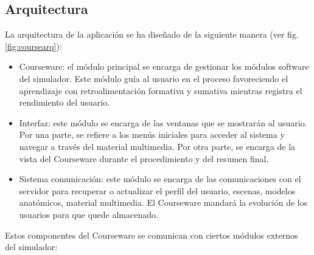 \subsection{Arquitectura}
\label{course:arq}
La arquitectura de la aplicación se ha diseñado de la siguiente manera (ver fig. \ref{fig:coursearq}):
\begin{itemize}
    \item \ac{Courseware}: el módulo principal se encarga de gestionar los módulos software del simulador. Este módulo guía al usuario en el proceso favoreciendo el aprendizaje con retroalimentación formativa y sumativa mientras registra el rendimiento del usuario.%
    \item Interfaz: este módulo se encarga de las ventanas que se mostrarán al usuario. Por una parte, se refiere a los menús iniciales para acceder al sistema y navegar a través del material multimedia. Por otra parte, se encarga de la vista del \ac{Courseware} durante el procedimiento y del resumen final.

\item Sistema comunicación: este módulo se encarga de las comunicaciones con el servidor para recuperar o actualizar el perfil del usuario, escenas, modelos anatómicos, material multimedia. El \ac{Courseware} mandará la evolución de los usuarios para que quede almacenado.
\end{itemize}


Estos componentes del \ac{Courseware} se comunican con ciertos módulos externos del simulador:

